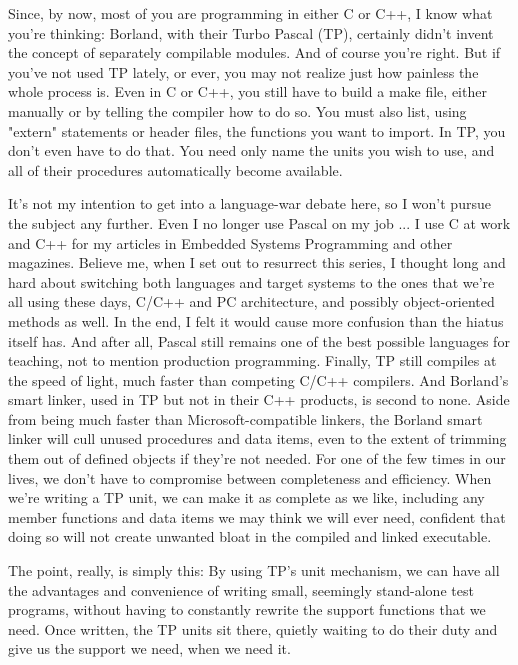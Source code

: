\documentclass[float=false, crop=false]{standalone}
\begin{document}
Since, by now, most of you are programming in either C or C++, I know what
you're thinking: Borland, with their Turbo Pascal (TP), certainly didn't invent
the concept of separately compilable modules. And of course you're right. But if
you've not used TP lately, or ever, you may not realize just how painless the
whole process is. Even in C or C++, you still have to build a make file, either
manually or by telling the compiler how to do so. You must also list, using
"extern" statements or header files, the functions you want to import. In TP,
you don't even have to do that. You need only name the units you wish to use,
and all of their procedures automatically become available.


It's not my intention to get into a language-war debate here, so I won't pursue
the subject any further. Even I no longer use Pascal on my job ... I use C at
work and C++ for my articles in Embedded Systems Programming and other
magazines. Believe me, when I set out to resurrect this series, I thought long
and hard about switching both languages and target systems to the ones that
we're all using these days, C/C++ and PC architecture, and possibly
object-oriented methods as well. In the end, I felt it would cause more
confusion than the hiatus itself has. And after all, Pascal still remains one of
the best possible languages for teaching, not to mention production programming.
Finally, TP still compiles at the speed of light, much faster than competing
C/C++ compilers. And Borland's smart linker, used in TP but not in their C++
products, is second to none. Aside from being much faster than
Microsoft-compatible linkers, the Borland smart linker will cull unused
procedures and data items, even to the extent of trimming them out of defined
objects if they're not needed. For one of the few times in our lives, we don't
have to compromise between completeness and efficiency. When we're writing a TP
unit, we can make it as complete as we like, including any member functions and
data items we may think we will ever need, confident that doing so will not
create unwanted bloat in the compiled and linked executable.

The point, really, is simply this: By using TP's unit mechanism, we can have all
the advantages and convenience of writing small, seemingly stand-alone test
programs, without having to constantly rewrite the support functions that we
need. Once written, the TP units sit there, quietly waiting to do their duty and
give us the support we need, when we need it.
\end{document}
